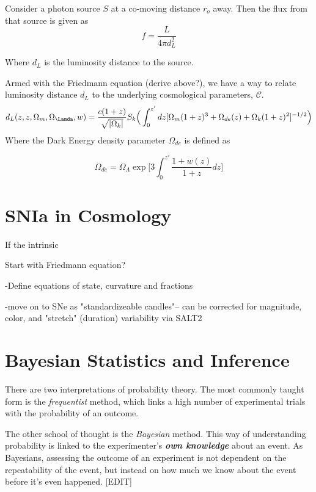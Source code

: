 \documentclass[12pt]{article}
\begin{document}
Consider a photon source $S$ at a co-moving distance $r_o$ away. Then the flux from that source is given as
\begin{equation} \label{eq:flux}
f = \frac{L}{4\pi d_{L}^2}
\end{equation}

Where $d_L$ is the luminosity distance to the source. 

Armed with the Friedmann equation (derive above?), we have a way to relate luminosity distance $d_L$ to the underlying cosmological parameters, $\mathscr{C}$.
\begin{equation}\label{d_l}
    d_L(z,z,\Omega_m, \Omega_{\Lamda}, w) = \frac{c(1+z)}{\sqrt{|\Omega_k|}}S_k \Big( \int_{0}^{z'} dz[\Omega_m(1+z)^3 + \Omega_{de}(z) + \Omega_k(1+z)^2]^{-1/2} \Big)
\end{equation}
Where the Dark Energy density parameter $\Omega_{de}$ is defined as

\begin{equation} \label{omegade}
\Omega_{de} = \Omega_{\Lambda}\exp \Big[3 \int_{0}^{z'} \frac{1+w(z)}{1+z}dz \Big]
\end{equation}

\section{SNIa in Cosmology}



If the intrinsic

Start with Friedmann equation?


-Define equations of state, curvature and fractions

-move on to SNe as "standardizeable candles"-- can be corrected for magnitude, color, and "stretch" (duration) variability via SALT2


\section{Bayesian Statistics and Inference}
There are two interpretations of probability theory. The most commonly taught form is the \textit{frequentist} method, which links a high number of experimental trials with the probability of an outcome. ~\cite{bayesianmethods}

The other school of thought is the \textit{Bayesian} method. This way of understanding probability is linked to the experimenter's \textbf{\textit{own knowledge}} about an event. As Bayesians, assessing the outcome of an experiment is not dependent on the repeatability of the event, but instead on how much we know about the event before it's even happened. [EDIT]
\end{document}
